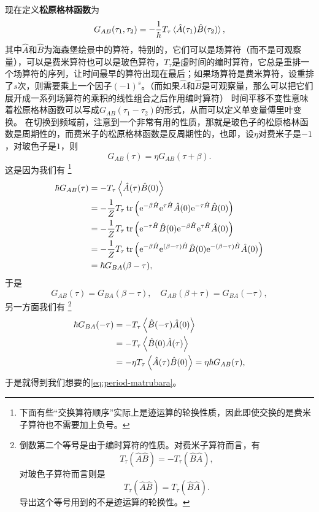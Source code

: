 \documentclass[hyperref, UTF8, a4paper]{ctexart}
\newcommand*{\ee}{\mathrm{e}}
\begin{document}
现在定义\textbf{松原格林函数}为
\begin{equation}
    G_{AB}(\tau_1, \tau_2) = - \frac{1}{\hbar} T_\tau \expval*{\hat{A}(\tau_1)\hat{B}(\tau_2)},
\end{equation}
其中$\hat{A}$和$\hat{B}$为海森堡绘景中的算符，特别的，它们可以是场算符（而不是可观察量），可以是费米算符也可以是玻色算符，$T_\tau$是虚时间的编时算符，它总是重排一个场算符的序列，让时间最早的算符出现在最后；如果场算符是费米算符，设重排了$s$次，则需要乘上一个因子$(-1)^s$。（而如果$\hat{A}$和$\hat{B}$是可观察量，那么可以把它们展开成一系列场算符的乘积的线性组合之后作用编时算符）
时间平移不变性意味着松原格林函数可以写成$G_{AB}(\tau_1-\tau_2)$的形式，从而可以定义单变量傅里叶变换。
在切换到频域前，注意到一个非常有用的性质，那就是玻色子的松原格林函数是周期性的，而费米子的松原格林函数是反周期性的，也即，设$\eta$对费米子是$-1$，对玻色子是$1$，则
\begin{equation}
    G_{AB}(\tau) = \eta G_{AB}(\tau+\beta).
    \label{eq:period-matrubara}
\end{equation}
这是因为我们有%
\footnote{下面有些“交换算符顺序”实际上是迹运算的轮换性质，因此即使交换的是费米子算符也不需要加上负号。}%
\[
    \begin{aligned}
        \hbar G_{AB}(\tau) &= - T_\tau \expval{\hat{A}(\tau)\hat{B}(0)} \\
        &= - \frac{1}{Z} T_\tau \trace \left( \ee^{-\beta \hat{H}} \ee^{\tau \hat{H}} \hat{A}(0) \ee^{ - \tau \hat{H}} \hat{B}(0) \right) \\
        &= - \frac{1}{Z} T_\tau \trace \left(  \ee^{ - \tau \hat{H}} \hat{B}(0) \ee^{-\beta \hat{H}} \ee^{\tau \hat{H}} \hat{A}(0) \right) \\
        &= - \frac{1}{Z} T_\tau \trace \left( \ee^{-\beta \hat{H}} \ee^{(\beta-\tau) \hat{H}} \hat{B}(0) \ee^{-(\beta-\tau)\hat{H}} \hat{A}(0) \right) \\
        &= \hbar G_{BA} (\beta - \tau),
    \end{aligned}
\]
于是
\begin{equation}
    G_{AB}(\tau) = G_{BA} (\beta - \tau), \quad G_{AB}(\beta+\tau) = G_{BA}(-\tau),
\end{equation}
另一方面我们有%
\footnote{倒数第二个等号是由于编时算符的性质。对费米子算符而言，有
\[
    T_\tau (\hat{A} \hat{B}) = - T_\tau (\hat{B} \hat{A}),
\]
对玻色子算符而言则是
\[
    T_\tau (\hat{A} \hat{B}) = T_\tau (\hat{B} \hat{A}).
\]
导出这个等号用到的不是迹运算的轮换性。
}
\[
    \begin{aligned}
        \hbar G_{BA}(-\tau) &= - T_\tau  \expval{\hat{B}(-\tau)\hat{A}(0)} \\
        &= - T_\tau \expval{\hat{B}(0)\hat{A}(\tau)} \\
        &= - \eta T_\tau \expval{\hat{A}(\tau)\hat{B}(0)} = \eta \hbar G_{AB}(\tau),
    \end{aligned}
\]
于是就得到我们想要的\eqref{eq:period-matrubara}。
\end{document}
